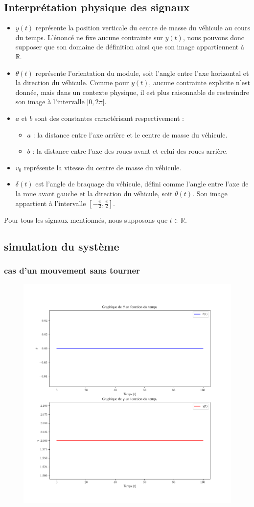 \documentclass[a4paper, 11pt]{article}
\begin{document}
\begin{enumerate}
\section*{Interprétation physique des signaux}  
\begin{itemize}
    \item \( y(t) \) représente la position verticale du centre de masse du véhicule au cours du temps. L'énoncé ne fixe aucune contrainte sur \( y(t) \), nous pouvons donc supposer que son domaine de définition ainsi que son image appartiennent à \( \mathbb{R} \).  
    \item \( \theta(t) \) représente l'orientation du module, soit l'angle entre l'axe horizontal et la direction du véhicule. Comme pour \( y(t) \), aucune contrainte explicite n’est donnée, mais dans un contexte physique, il est plus raisonnable de restreindre son image à l’intervalle \( [0, 2\pi[\).  
    \item \( a \) et \( b \) sont des constantes caractérisant respectivement :  
    \begin{itemize}
        \item \( a \) : la distance entre l'axe arrière et le centre de masse du véhicule.  
        \item \( b \) : la distance entre l’axe des roues avant et celui des roues arrière.  
    \end{itemize}
    \item \( v_0 \) représente la vitesse du centre de masse du véhicule.  
    \item \( \delta(t) \) est l’angle de braquage du véhicule, défini comme l’angle entre l’axe de la roue avant gauche et la direction du véhicule, soit \( \theta(t) \). Son image appartient à l’intervalle \( \left[ -\frac{\pi}{2}, \frac{\pi}{2} \right] \).  
\end{itemize}

Pour tous les signaux mentionnés, nous supposons que \( t \in \mathbb{R} \).  

\subsection{simulation du système}
\subsubsection{cas d'un mouvement sans tourner}
\begin{figure}[!h]
    \centering
    \includegraphics[width=0.5\linewidth]{Q3_flat.png}
\end{figure}
\newpage

\end{enumerate}
\end{document}
